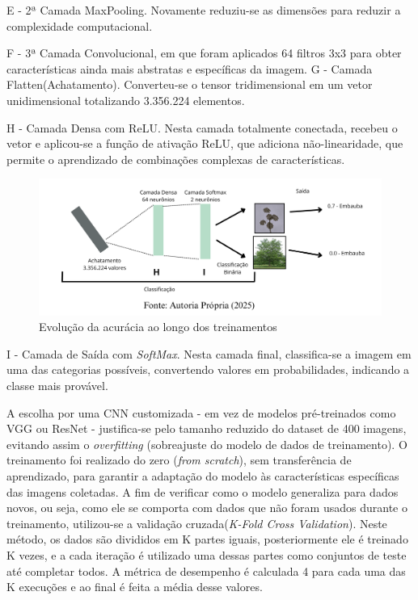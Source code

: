 E - 2ª Camada MaxPooling. Novamente reduziu-se as dimensões para reduzir a complexidade computacional.

F - 3ª Camada Convolucional, em que foram aplicados 64 filtros 3x3 para obter características ainda mais abstratas e específicas da imagem.
G - Camada Flatten(Achatamento). Converteu-se o tensor tridimensional em um vetor unidimensional totalizando 3.356.224 elementos.

H - Camada Densa com ReLU. Nesta camada totalmente conectada, recebeu o vetor e aplicou-se a função de ativação ReLU, que adiciona não-linearidade, que permite o aprendizado de combinações complexas de características.

\begin{figure}[!h]
    \centering
    \caption{Evolução da acurácia ao longo dos treinamentos}
    \label{Gráfico 3}
    \includegraphics[width=0.9\linewidth]{Illustrations/tensorflow2.png}
\end{figure}

I - Camada de Saída com \textit{SoftMax}. Nesta camada final, classifica-se a imagem em uma das categorias possíveis, convertendo valores em probabilidades, indicando a classe mais provável.

A escolha por uma CNN customizada - em vez de modelos pré-treinados como VGG ou ResNet - justifica-se pelo tamanho reduzido do dataset de 400 imagens, evitando assim o \textit{overfitting} (sobreajuste do modelo de dados de treinamento). O treinamento foi realizado do zero (\textit{from scratch}), sem transferência de aprendizado, para garantir a adaptação do modelo às características específicas das imagens coletadas. 
A fim de verificar como o modelo generaliza para dados novos, ou seja, como ele se comporta com dados que não foram usados durante o treinamento, utilizou-se a validação cruzada(\textit{K-Fold Cross Validation}). Neste método, os dados são divididos em K partes iguais, posteriormente ele é treinado K vezes, e a cada iteração é utilizado uma dessas partes como conjuntos de teste até completar todos. A métrica de desempenho é calculada 4 para cada uma das K execuções e ao final é feita a média desse valores.

